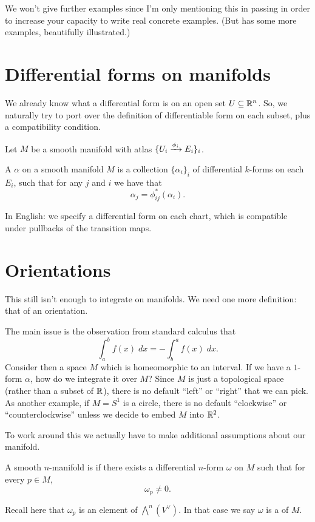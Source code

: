We won't give further examples
since I'm only mentioning this in passing
in order to increase your capacity to write real concrete examples.
(But \cite[Chapter 6.2]{ref:manifolds} has some more examples,
beautifully illustrated.)

\section{Differential forms on manifolds}
We already know what a differential form is on an open set $U \subseteq \mathbb R^n$.
So, we naturally try to port over the definition of
differentiable form on each subset, plus a compatibility condition.

Let $M$ be a smooth manifold with atlas $\{ U_i \xrightarrow{\phi_i} E_i \}_i$.

\begin{definition}
	A  $\alpha$ on a smooth manifold $M$
	is a collection $\{\alpha_i\}_i$ of differential $k$-forms on each $E_i$,
	such that for any $j$ and $i$ we have that
	\[ \alpha_j = \phi_{ij}^\ast(\alpha_i). \]
\end{definition}
In English: we specify a differential form on each chart,
which is compatible under pullbacks of the transition maps.

\section{Orientations}

This still isn't enough to integrate on manifolds.
We need one more definition: that of an orientation.

The main issue is the observation from standard calculus that
\[ \int_a^b f(x) \; dx = - \int_b^a f(x) \; dx. \]
Consider then a space $M$ which is homeomorphic to an interval.
If we have a $1$-form $\alpha$, how do we integrate it over $M$?
Since $M$ is just a topological space (rather than a subset of $\mathbb R$),
there is no default ``left'' or ``right'' that we can pick.
As another example, if $M = S^1$ is a circle, there is
no default ``clockwise'' or ``counterclockwise'' unless we decide
to embed $M$ into $\mathbb R^2$.

To work around this we actually have to
make additional assumptions about our manifold.
\begin{definition}
	A smooth $n$-manifold is  if
	there exists a differential $n$-form $\omega$ on $M$
	such that for every $p \in M$,
	\[ \omega_p \neq 0. \]
\end{definition}
Recall here that $\omega_p$ is an element of $\bigwedge^n(V^\vee)$.
In that case we say $\omega$ is a  of $M$.

